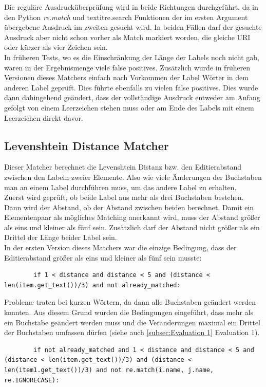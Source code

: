		Die reguläre Ausdrucküberprüfung wird in beide Richtungen durchgeführt, da in
		den Python \textit{re.match} und textit{re.search} Funktionen der im ersten
		Argument übergebene Ausdruck im zweiten gesucht wird. In beiden Fällen darf
		der gesuchte Ausdruck aber nicht schon vorher als Match markiert worden, die
		gleiche URI oder kürzer als vier Zeichen sein.\\
		In früheren Tests, wo es die Einschränkung der Länge der Labels noch nicht
		gab, waren in der Ergebnismenge viele false positives. Zusätzlich wurde in
		früheren Versionen dieses Matchers einfach nach Vorkommen der Label Wörter in
		dem anderen Label geprüft. Dies führte ebenfalls zu vielen false positives.
		Dies wurde dann dahingehend geändert, dass der vollständige Ausdruck entweder
		am Anfang gefolgt von einem Leerzeichen stehen muss oder am Ende des Labels mit
		einem Leerzeichen direkt davor.
		
		\subsection{Levenshtein Distance Matcher}
		Dieser Matcher berechnet die Levenshtein Distanz bzw. den Editierabstand
		zwischen den Labeln zweier Elemente. Also wie viele Änderungen der Buchstaben
		man an einem Label durchführen muss, um das andere Label zu erhalten.\\
		Zuerst wird geprüft, ob beide Label aus mehr als drei Buchstaben bestehen.
		Dann wird der Abstand, ob der Abstand zwischen beiden berechnet. Damit ein
		Elementenpaar als mögliches Matching anerkannt wird, muss der Abstand größer
		als eins und kleiner als fünf sein. Zusätzlich darf der Abstand nicht größer
		als ein Drittel der Länge beider Label sein.\\
		In der ersten Version dieses Matchers war die einzige Bedingung, dass der
		Editierabstand größer als eins und kleiner als fünf sein musste:
		\begin{lstlisting}
		if 1 < distance and distance < 5 and (distance < len(item.get_text())/3) and not already_matched:
		\end{lstlisting}
		Probleme traten bei kurzen Wörtern, da dann alle Buchstaben geändert werden
		konnten. Aus diesem Grund wurden die Bedingungen eingeführt, dass mehr als ein Buchstabe
		geändert werden muss und die Veränderungen maximal ein Drittel der Buchstaben
		umfassen dürfen (siehe auch \ref{subsec:Evaluation 1} Evaluation 1).
		\begin{lstlisting}
		if not already_matched and 1 < distance and distance < 5 and (distance < len(item.get_text())/3) and (distance < len(item1.get_text())/3) and not re.match(i.name, j.name, re.IGNORECASE):
		\end{lstlisting}
				
